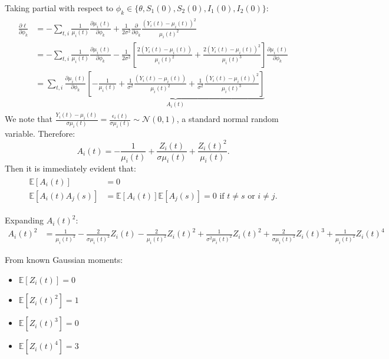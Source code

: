 Taking partial with respect to $\phi_k \in \{\theta, S_1(0),
S_2(0), I_1(0), I_2(0)\}$:
\begin{align}\label{eq:partial}
  \begin{split}
  \frac{\partial \ell}{\partial \phi_k} &= -\sum_{t,i} \frac{1}{\mu_i(t)} \frac{\partial \mu_i(t)}{\partial \phi_k} + \frac{1}{2\sigma^2} \frac{\partial}{\partial \phi_k}\frac{(Y_i(t) - \mu_i(t))^2}{\mu_i(t)^2}\\
  &= -\sum_{t,i} \frac{1}{\mu_i(t)} \frac{\partial \mu_i(t)}{\partial \phi_k} - \frac{1}{2\sigma^2}\left[\frac{2(Y_i(t) - \mu_i(t))}{\mu_i(t)^2} +\frac{2(Y_i(t) - \mu_i(t))^2}{\mu_i(t)^3}\right ] \frac{\partial \mu_i(t)}{\partial \phi_k} \\
  &=\sum_{t,i} \frac{\partial \mu_i(t)}{\partial \phi_k} \underbrace{\left[-\frac{1}{\mu_i(t)} + \frac{1}{\sigma^2}\frac{(Y_i(t) - \mu_i(t))}{\mu_i(t)^2} + \frac{1}{\sigma^2}\frac{(Y_i(t) - \mu_i(t))^2}{\mu_i(t)^3}\right]}_{A_i(t)}
  \end{split}
\end{align}
We note that $\frac{Y_i(t) - \mu_i(t)}{\sigma\mu_i(t)} =
\frac{\epsilon_i(t)}{\sigma\mu_i(t)} \sim \mathcal{N}(0,1)$, a
standard normal random variable. Therefore:
\begin{equation}
  A_i(t) = -\frac{1}{\mu_i(t)} +\frac{Z_i(t)}{\sigma \mu_i(t)} + \frac{Z_i(t)^2}{\mu_i(t)}. 
\end{equation}
Then it is immediately evident that:
\begin{align}\begin{split}\label{eq:ind ait}
  \mathbb{E}[A_i(t)] &= 0 \\
  \mathbb{E}[A_i(t) A_j(s)] &= \mathbb{E}[A_i(t)]\mathbb{E}[A_j(s)] = 0 \text{ if } t\neq s \text{ or } i\neq j.
\end{split}\end{align}



Expanding $A_i(t)^2$:
\begin{align*}
A_i(t)^2 &= \frac{1}{\mu_i(t)^2} - \frac{2}{\sigma\mu_i(t)^2}Z_i(t) - \frac{2}{\mu_i(t)^2}Z_i(t)^2 + \frac{1}{\sigma^2\mu_i(t)^2}Z_i(t)^2 + \frac{2}{\sigma\mu_i(t)^2}Z_i(t)^3 + \frac{1}{\mu_i(t)^2}Z_i(t)^4
\end{align*}

From known Gaussian moments:
\begin{itemize}
\item $\mathbb{E}[Z_i(t)] = 0$
\item $\mathbb{E}[Z_i(t)^2] = 1$
\item $\mathbb{E}[Z_i(t)^3] = 0$ 
\item $\mathbb{E}[Z_i(t)^4] = 3$
\end{itemize}

